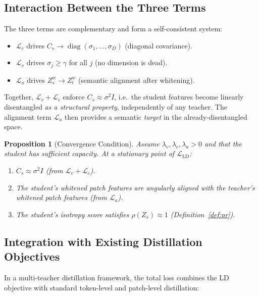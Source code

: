 \documentclass[11pt,a4paper]{article}
\newtheorem{proposition}[theorem]{Proposition}
\newcommand{\calL}{\mathcal{L}}
\newcommand{\diag}{\operatorname{diag}}
\begin{document}
\subsection{Interaction Between the Three Terms}
\label{sec:interaction}

The three terms are complementary and form a self-consistent system:

\begin{itemize}
    \item $\calL_c$ drives $C_s \to \diag(\sigma_1, \ldots, \sigma_D)$
          (diagonal covariance).
    \item $\calL_v$ drives $\sigma_j \ge \gamma$ for all $j$
          (no dimension is dead).
    \item $\calL_a$ drives $Z_s^w \to Z_t^w$ (semantic alignment after whitening).
\end{itemize}

Together, $\calL_v + \calL_c$ enforce $C_s \approx \sigma^2 I$, i.e.\ the
student features become linearly disentangled \emph{as a structural property},
independently of any teacher.  The alignment term $\calL_a$ then provides a
semantic \emph{target} in the already-disentangled space.

\begin{proposition}[Convergence Condition]
Assume $\lambda_v, \lambda_c, \lambda_a > 0$ and that the student has sufficient
capacity.  At a stationary point of $\calL_{\mathrm{LD}}$:
\begin{enumerate}
    \item $C_s \approx \sigma^2 I$ (from $\calL_v + \calL_c$).
    \item The student's whitened patch features are angularly aligned with the
          teacher's whitened patch features (from $\calL_a$).
    \item The student's isotropy score satisfies $\rho(Z_s) \approx 1$
          (Definition~\ref{def:pr}).
\end{enumerate}
\end{proposition}

\subsection{Integration with Existing Distillation Objectives}
\label{sec:integration}

In a multi-teacher distillation framework, the total loss combines the LD
objective with standard token-level and patch-level distillation:
\end{document}
